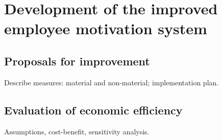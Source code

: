 \chapter{Development of the improved employee motivation system}
\section{Proposals for improvement}
Describe measures: material and non-material; implementation plan.

\section{Evaluation of economic efficiency}
Assumptions, cost-benefit, sensitivity analysis.

